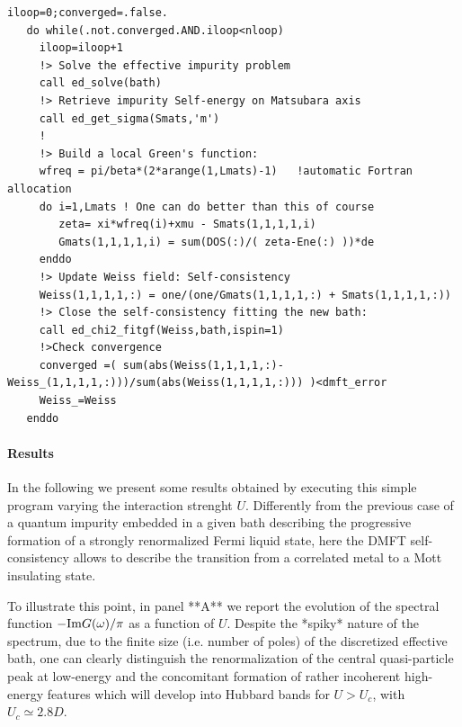 \documentclass[edipack2.tex]{subfiles}
\begin{document}
\begin{lstlisting}[style=fstyle,numbers=none,basicstyle={\scriptsize\ttfamily}]
iloop=0;converged=.false.
   do while(.not.converged.AND.iloop<nloop)
     iloop=iloop+1     
     !> Solve the effective impurity problem
     call ed_solve(bath)     
     !> Retrieve impurity Self-energy on Matsubara axis
     call ed_get_sigma(Smats,'m')
     !
     !> Build a local Green's function:
     wfreq = pi/beta*(2*arange(1,Lmats)-1)   !automatic Fortran allocation
     do i=1,Lmats ! One can do better than this of course 
        zeta= xi*wfreq(i)+xmu - Smats(1,1,1,1,i)
        Gmats(1,1,1,1,i) = sum(DOS(:)/( zeta-Ene(:) ))*de  
     enddo
     !> Update Weiss field: Self-consistency
     Weiss(1,1,1,1,:) = one/(one/Gmats(1,1,1,1,:) + Smats(1,1,1,1,:))
     !> Close the self-consistency fitting the new bath:
     call ed_chi2_fitgf(Weiss,bath,ispin=1)     
     !>Check convergence
     converged =( sum(abs(Weiss(1,1,1,1,:)-Weiss_(1,1,1,1,:)))/sum(abs(Weiss(1,1,1,1,:))) )<dmft_error
     Weiss_=Weiss     
   enddo
\end{lstlisting}


\paragraph{Results}
In the following we present some results obtained by executing this
simple program varying the interaction strenght $U$. 
Differently from the previous case of a quantum impurity embedded in a
given bath describing the progressive formation of a
strongly renormalized Fermi liquid state, here the DMFT
self-consistency allows to describe the transition from a correlated
metal to a Mott insulating state.


To illustrate this point, in panel **A** we report the evolution of
the spectral function $-{\rm Im}G(\omega)/\pi$ as a function of
$U$. Despite the *spiky* nature of the spectrum, due to the
finite size (i.e. number of poles) of the discretized effective bath,
one can clearly distinguish the renormalization of the central
quasi-particle peak at low-energy and the concomitant formation of
rather incoherent  high-energy features which will develop into
Hubbard bands for $U>U_c$, with $U_c\simeq 2.8D$. 
\end{document}

